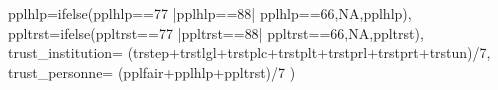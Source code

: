 \documentclass[
]{book}
\newenvironment{Shaded}{\begin{snugshade}}{\end{snugshade}}
\newcommand{\AttributeTok}[1]{\textcolor[rgb]{0.77,0.63,0.00}{#1}}
\newcommand{\ConstantTok}[1]{\textcolor[rgb]{0.00,0.00,0.00}{#1}}
\newcommand{\DecValTok}[1]{\textcolor[rgb]{0.00,0.00,0.81}{#1}}
\newcommand{\FunctionTok}[1]{\textcolor[rgb]{0.00,0.00,0.00}{#1}}
\newcommand{\NormalTok}[1]{#1}
\newcommand{\SpecialCharTok}[1]{\textcolor[rgb]{0.00,0.00,0.00}{#1}}
\begin{document}
\begin{Shaded}
\begin{Highlighting}[]
         \AttributeTok{pplhlp=}\FunctionTok{ifelse}\NormalTok{(pplhlp}\SpecialCharTok{==}\DecValTok{77} \SpecialCharTok{|}\NormalTok{pplhlp}\SpecialCharTok{==}\DecValTok{88}\SpecialCharTok{|}\NormalTok{ pplhlp}\SpecialCharTok{==}\DecValTok{66}\NormalTok{,}\ConstantTok{NA}\NormalTok{,pplhlp),}
         \AttributeTok{ppltrst=}\FunctionTok{ifelse}\NormalTok{(ppltrst}\SpecialCharTok{==}\DecValTok{77} \SpecialCharTok{|}\NormalTok{ppltrst}\SpecialCharTok{==}\DecValTok{88}\SpecialCharTok{|}\NormalTok{ ppltrst}\SpecialCharTok{==}\DecValTok{66}\NormalTok{,}\ConstantTok{NA}\NormalTok{,ppltrst),}
         \AttributeTok{trust\_institution=}\NormalTok{ (trstep}\SpecialCharTok{+}\NormalTok{trstlgl}\SpecialCharTok{+}\NormalTok{trstplc}\SpecialCharTok{+}\NormalTok{trstplt}\SpecialCharTok{+}\NormalTok{trstprl}\SpecialCharTok{+}\NormalTok{trstprt}\SpecialCharTok{+}\NormalTok{trstun)}\SpecialCharTok{/}\DecValTok{7}\NormalTok{,}
         \AttributeTok{trust\_personne=}\NormalTok{ (pplfair}\SpecialCharTok{+}\NormalTok{pplhlp}\SpecialCharTok{+}\NormalTok{ppltrst)}\SpecialCharTok{/}\DecValTok{7}
\NormalTok{         )}



\end{Highlighting}
\end{Shaded}
\end{document}
